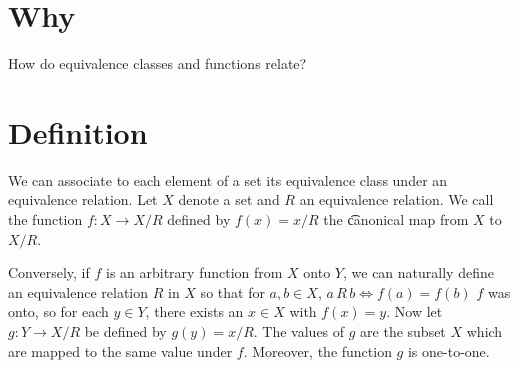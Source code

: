 

\section*{Why}

How do equivalence classes and functions relate?

\section*{Definition}

We can associate to each element of a set its equivalence class under an equivalence relation.
Let $X$ denote a set and $R$ an equivalence relation.
We call the function $f: X \to X/R$ defined by $f(x) = x/R$ the \t{canonical map} from $X$ to $X/R$.

Conversely, if $f$ is an arbitrary function from $X$ onto $Y$, we can naturally define an equivalence relation $R$ in $X$ so that for $a, b \in X$, $a\,R\,b \iff f(a) = f(b)$
$f$ was onto, so for each $y \in Y$, there exists an $x \in X$ with $f(x) = y$.
Now let $g: Y \to X/R$ be defined by $g(y) = x/R$.
The values of $g$ are the subset $X$ which are mapped to the same value under $f$.
Moreover, the function $g$ is one-to-one.

\blankpage
